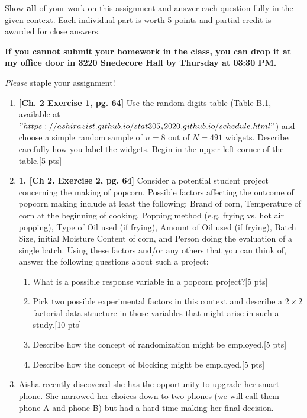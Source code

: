 \documentclass[11pt]{article}\usepackage[]{graphicx}\usepackage[]{color}
\begin{document}
\pagestyle{fancy} 

Show \textbf{all} of your work on this assignment and answer each question fully in the given context. 
Each individual part is worth 5 points and partial credit is awarded for close answers.
\vspace{0.3cm}

\textbf{If you cannot submit your homework in the class, you can drop it at my office door in 3220 Snedecore Hall by Thursday at 03:30 PM.}

\vspace{0.3cm}
\emph{Please} staple your assignment!

\begin{enumerate}

\item \textbf{[Ch. 2 Exercise 1, pg. 64]} Use the random digits table (Table B.1, available at $"https://ashirazist.github.io/stat305_s2020.github.io/schedule.html"$) and choose a simple random sample of $n = 8$ out of $N = 491$ widgets. Describe carefully how you label the widgets. Begin in the upper left corner of the table.[5 pts] 
\item \textbf{
1. [Ch 2. Exercise 2, pg. 64]} Consider a potential student project concerning the making of popcorn. Possible factors affecting the outcome of popcorn making include at least the following: Brand of corn, Temperature of corn at the beginning of cooking, Popping method (e.g. frying vs. hot air popping), Type of Oil used (if frying), Amount of Oil used (if frying), Batch Size, initial Moisture Content of corn, and Person doing the evaluation of a single batch. Using these factors and/or any others that you can think of, answer the following questions about such a project:

      \begin{enumerate}
          \item What is a possible response variable in a popcorn project?[5 pts]
          \item Pick two possible experimental factors in this context and describe a $2 \times 2$ factorial data structure in those variables that might arise in such a study.[10 pts]
          \item Describe how the concept of randomization might be employed.[5 pts]
          \item Describe how the concept of blocking might be employed.[5 pts]
      \end{enumerate}
      
   \item Aisha recently discovered she has the opportunity to upgrade her smart phone. She narrowed her choices down to two phones (we will call them phone A and phone B) but had a hard time making her final decision.
  

\end{enumerate}
\end{document}
